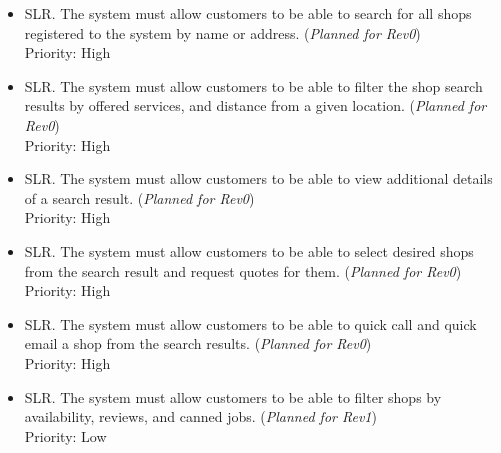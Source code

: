 \documentclass[12pt]{article}
\newcounter{searchreqnum} %
\newcounter{vendorreqnum} %
\newcommand{\rev}[1]{(\textit{Planned for Rev#1})}
\begin{document}
\begin {itemize}
    \item[SLR\refstepcounter{searchreqnum}\thesearchreqnum \label{R_Output}.] The system must allow customers to be able to search for all shops registered to the system by name or address. \rev{0} \\
    Priority: High
    
    \item[SLR\refstepcounter{searchreqnum}\thesearchreqnum \label{R_Output}.] The system must allow customers to be able to filter the shop search results by offered services, and distance from a given location. \rev{0} \\
    Priority: High

    \item[SLR\refstepcounter{searchreqnum}\thesearchreqnum \label{R_Output}.] The system must allow customers to be able to view additional details of a search result. \rev{0} \\
    Priority: High

    \item[SLR\refstepcounter{searchreqnum}\thesearchreqnum \label{R_Output}.] The system must allow customers to be able to select desired shops from the search result and request quotes for them. \rev{0} \\
    Priority: High

    \item[SLR\refstepcounter{searchreqnum}\thesearchreqnum \label{R_Output}.] The system must allow customers to be able to quick call and quick email a shop from the search results. \rev{0} \\
    Priority: High

    \item[SLR\refstepcounter{searchreqnum}\thesearchreqnum \label{R_Output}.] The system must allow customers to be able to filter shops by availability, reviews, and canned jobs. \rev{1} \\
    Priority: Low

\end {itemize}


    
\end{document}
